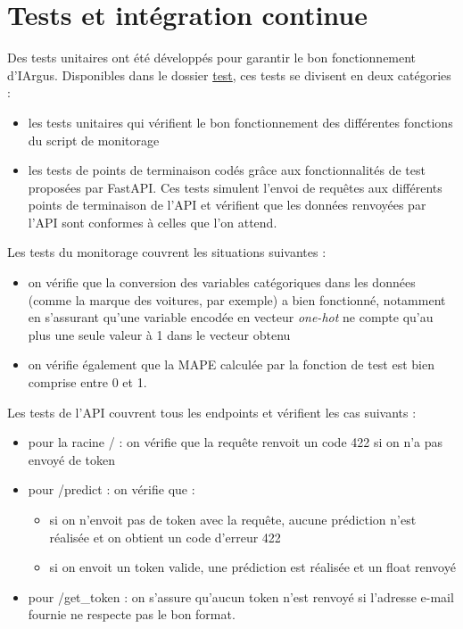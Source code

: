 \documentclass[french]{article}
\begin{document}
    

    \section{Tests et intégration continue}

    Des tests unitaires ont été développés pour garantir le bon fonctionnement d'IArgus. Disponibles dans le dossier \href{https://github.com/vinpap/iargus/tree/8e63c88368532a1a424799e698f20b873ee2dc4f/test}{test}, ces tests se divisent en deux catégories :
    \begin{itemize}
        \item les tests unitaires qui vérifient le bon fonctionnement des différentes fonctions du script de monitorage
        \item les tests de points de terminaison codés grâce aux fonctionnalités de test proposées par FastAPI. Ces tests simulent l'envoi de requêtes aux différents points de terminaison de l'API et vérifient que les données renvoyées par l'API sont conformes à celles que l'on attend.
    \end{itemize}

    Les tests du monitorage couvrent les situations suivantes :
    \begin{itemize}
        \item on vérifie que la conversion des variables catégoriques dans les données (comme la marque des voitures, par exemple) a bien fonctionné, notamment en s'assurant qu'une variable encodée en vecteur \textit{one-hot} ne compte qu'au plus une seule valeur à 1 dans le vecteur obtenu
        \item on vérifie également que la MAPE calculée par la fonction de test est bien comprise entre 0 et 1.
    \end{itemize}

    Les tests de l'API couvrent tous les endpoints et vérifient les cas suivants :
    \begin{itemize}
        \item pour la racine / : on vérifie que la requête renvoit un code 422 si on n'a pas envoyé de token
        \item pour /predict : on vérifie que :
        \begin{itemize}
            \item si on n'envoit pas de token avec la requête, aucune prédiction n'est réalisée et on obtient un code d'erreur 422
            \item si on envoit un token valide, une prédiction est réalisée et un float renvoyé
        \end{itemize}
        \item pour /get\_token : on s'assure qu'aucun token n'est renvoyé si l'adresse e-mail fournie ne respecte pas le bon format.
    \end{itemize}
\end{document}
